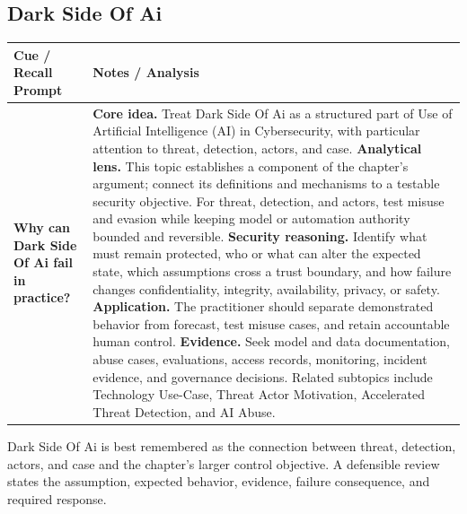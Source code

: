 \documentclass[11pt]{article}
\newcommand{\CornellHeader}{%
\rowcolor{Navy}\color{white}\bfseries Cue / Recall Prompt & \color{white}\bfseries Notes / Analysis\\\hline}
\newcommand{\CornellRow}[2]{%
\cellcolor{CueGray}\RaggedRight\textbf{#1} & \RaggedRight #2\\\hline}
\begin{document}
\subsection*{Dark Side Of Ai}
\begin{longtable}{>{\RaggedRight\arraybackslash}p{}|>{\RaggedRight\arraybackslash}p{}}
\CornellHeader
\CornellRow{Why can Dark Side Of Ai fail in practice?}{\textbf{Core idea.} Treat Dark Side Of Ai as a structured part of Use of Artificial Intelligence (AI) in Cybersecurity, with particular attention to threat, detection, actors, and case. \textbf{Analytical lens.} This topic establishes a component of the chapter's argument; connect its definitions and mechanisms to a testable security objective. For threat, detection, and actors, test misuse and evasion while keeping model or automation authority bounded and reversible. \textbf{Security reasoning.} Identify what must remain protected, who or what can alter the expected state, which assumptions cross a trust boundary, and how failure changes confidentiality, integrity, availability, privacy, or safety. \textbf{Application.} The practitioner should separate demonstrated behavior from forecast, test misuse cases, and retain accountable human control. \textbf{Evidence.} Seek model and data documentation, abuse cases, evaluations, access records, monitoring, incident evidence, and governance decisions. Related subtopics include Technology Use-Case, Threat Actor Motivation, Accelerated Threat Detection, and AI Abuse.}
\end{longtable}
\begin{topicsummary}
Dark Side Of Ai is best remembered as the connection between threat, detection, actors, and case and the chapter's larger control objective. A defensible review states the assumption, expected behavior, evidence, failure consequence, and required response.
\end{topicsummary}
\end{document}
